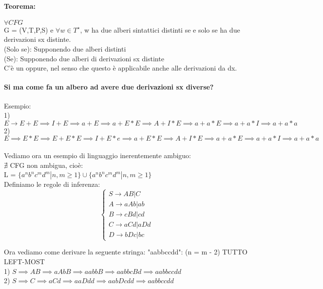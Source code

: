 \documentclass[12pt, a4paper, openany, oneside]{book}
\begin{document}
\paragraph{Teorema: } $\forall CFG$ \\
G = (V,T,P,S) e $\forall w\in T^{\star}$, w ha due alberi sintattici distinti se e
solo se ha due derivazioni sx distinte. \\
(Solo se): Supponendo due alberi distinti \\
(Se): Supponendo due alberi di derivazioni sx distinte\\ 
C'è un oppure, nel senso che questo è applicabile anche alle derivazioni da dx.
\paragraph{Si ma come fa un albero ad avere due derivazioni sx diverse?}
Esempio:\\
1) $E \to E + E \implies I + E \implies a + E \implies a + E * E \implies A + I * E
\implies a + a * E \implies a + a * I \implies a + a * a $\\
2) $E \implies E * E \implies E + E * E \implies I + E * e \implies a + E * E \implies A + I * E
\implies a + a * E \implies a + a * I \implies a + a * a $ \\ \\ 
Vediamo ora un esempio di linguaggio inerentemente ambiguo: \\
$\nexists$ CFG non ambigua, cioè: \\
L = $\{a^{n} b^{n} c^{m} d^{m} | n, m \geq 1\} \cup 
\{a^{n} b^{n} c^{m} d^{m} | n, m \geq 1\}$ \\
Definiamo le regole di inferenza: \\
$$\begin{cases}
S \to AB|C \\
A \to aAb|ab \\
B \to cBd|cd \\
C \to aCd|aDd \\
D \to bDc|bc 
\end{cases}$$

Ora vediamo come derivare la seguente stringa: "aabbccdd": (n = m - 2) TUTTO LEFT-MOST\\
1) $S \implies AB \implies aAbB \implies aabbB \implies aabbcBd \implies aabbccdd$ \\
2) $S \implies C \implies aCd \implies aaDdd \implies aabDcdd \implies aabbccdd$ \\
\\
\end{document}
